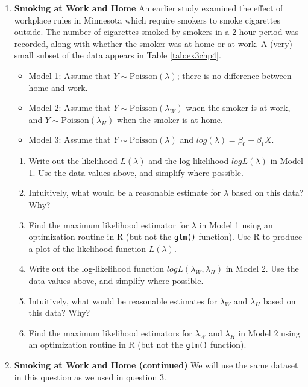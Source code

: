 \documentclass[
]{krantz}
\providecommand{\tightlist}{%
  \setlength{\itemsep}{0pt}\setlength{\parskip}{0pt}}
\begin{document}
\begin{enumerate}
\def\labelenumi{\arabic{enumi}.}
\setcounter{enumi}{2}
\item
  \textbf{Smoking at Work and Home} An earlier study examined the effect of workplace rules in Minnesota which require smokers to smoke cigarettes outside. The number of cigarettes smoked by smokers in a 2-hour period was recorded, along with whether the smoker was at home or at work. A (very) small subset of the data appears in Table \ref{tab:ex3chp4}.

  \begin{itemize}
  \tightlist
  \item
    Model 1: Assume that \(Y \sim \textrm{Poisson}(\lambda)\); there is no difference between home and work.
  \item
    Model 2: Assume that \(Y \sim \textrm{Poisson}(\lambda_W)\) when the smoker is at work, and \(Y \sim \textrm{Poisson}(\lambda_H)\) when the smoker is at home.
  \item
    Model 3: Assume that \(Y \sim \textrm{Poisson}(\lambda)\) and \(log(\lambda)=\beta_0+\beta_1X\).
  \end{itemize}

  \begin{enumerate}
  \def\labelenumii{\alph{enumii}.}
  \tightlist
  \item
    Write out the likelihood \(L(\lambda)\) and the log-likelihood \(logL(\lambda)\) in Model 1. Use the data values above, and simplify where possible.
  \item
    Intuitively, what would be a reasonable estimate for \(\lambda\) based on this data? Why?
  \item
    Find the maximum likelihood estimator for \(\lambda\) in Model 1 using an optimization routine in R (but not the \texttt{glm()} function). Use R to produce a plot of the likelihood function \(L(\lambda)\).
  \item
    Write out the log-likelihood function \(logL(\lambda_W, \lambda_H)\) in Model 2. Use the data values above, and simplify where possible.
  \item
    Intuitively, what would be reasonable estimates for \(\lambda_W\) and \(\lambda_H\) based on this data? Why?
  \item
    Find the maximum likelihood estimators for \(\lambda_W\) and \(\lambda_H\) in Model 2 using an optimization routine in R (but not the \texttt{glm()} function).
  \end{enumerate}
\item
  \textbf{Smoking at Work and Home (continued)} We will use the same dataset in this question as we used in question 3.


\end{enumerate}
\end{document}
